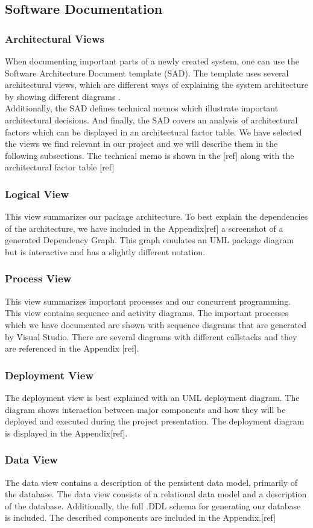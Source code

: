 \subsection{Software Documentation}
\subsubsection{Architectural Views}
When documenting important parts of a newly created system, one can use the Software Architecture Document template (SAD). The template uses several architectural views, which are different ways of explaining the system architecture by showing different diagrams \cite[p.~656]{OOAD}.\\
Additionally, the SAD defines technical memos which illustrate important architectural decisions. And finally, the SAD covers an analysis
of architectural factors which can be displayed in an architectural factor table. 
We have selected the views we find relevant in our project and we will describe them in the following subsections.
The technical memo is shown in the [ref] along with the architectural factor table [ref]

\subsubsection{Logical View} 
This view summarizes our package architecture. To best explain the dependencies of the architecture, we have included in the Appendix[ref] a
screenshot of a generated Dependency Graph. This graph emulates an UML package diagram but is interactive and has a slightly different notation.
\subsubsection{Process View}
This view summarizes important processes and our concurrent programming. This view contains sequence and activity diagrams.
The important processes which we have documented are shown with sequence diagrams that are generated by Visual Studio. There are several diagrams
with different callstacks and they are referenced in the Appendix [ref]. 
\subsubsection{Deployment View}
The deployment view is best explained with an UML deployment diagram. The diagram shows interaction between major components and how they
will be deployed and executed during the project presentation. The deployment diagram is displayed in the Appendix[ref].
\subsubsection{Data View}
The data view contains a description of the persistent data model, primarily of the database. The data view consists of a relational data model
and a description of the database. Additionally, the full .DDL schema for generating our database is included. The described components are included in the Appendix.[ref]


